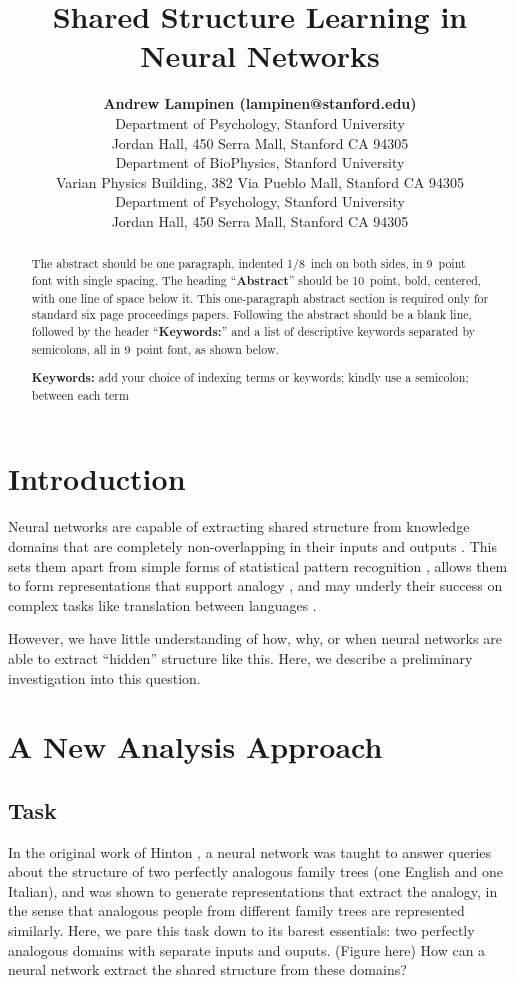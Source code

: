 \documentclass[10pt,letterpaper]{article}
\title{Shared Structure Learning in Neural Networks}
\author{{\large \bf Andrew Lampinen (lampinen@stanford.edu)} \\
  Department of Psychology, Stanford University \\
  Jordan Hall, 450 Serra Mall, Stanford CA 94305 
  \AND {\large \bf Shaw Hsu (cshawhsu@stanford.edu)} \\
  Department of BioPhysics, Stanford University \\
  Varian Physics Building, 382 Via Pueblo Mall, Stanford CA 94305
  \AND {\large \bf James L. McClelland (mcclelland@stanford.edu)} \\
  Department of Psychology, Stanford University \\
  Jordan Hall, 450 Serra Mall, Stanford CA 94305}
\begin{document}
\maketitle


\begin{abstract}
The abstract should be one paragraph, indented 1/8~inch on both sides,
in 9~point font with single spacing. The heading ``{\bf Abstract}''
should be 10~point, bold, centered, with one line of space below
it. This one-paragraph abstract section is required only for standard
six page proceedings papers. Following the abstract should be a blank
line, followed by the header ``{\bf Keywords:}'' and a list of
descriptive keywords separated by semicolons, all in 9~point font, as
shown below.

\textbf{Keywords:} 
add your choice of indexing terms or keywords; kindly use a
semicolon; between each term
\end{abstract}


\section{Introduction}
Neural networks are capable of extracting shared structure from knowledge domains that are completely non-overlapping in their inputs and outputs \cite{Hinton1986}. This sets them apart from simple forms of statistical pattern recognition \cite{Rogers2008}, allows them to form representations that support analogy \cite{Pennington2014,Kollias2013}, and may underly their success on complex tasks like translation between languages \cite[e.g.]{Wu2016}. \par
However, we have little understanding of how, why, or when neural networks are able to extract ``hidden'' structure like this. Here, we describe a preliminary investigation into this question. 
\section{A New Analysis Approach}
\subsection{Task}
In the original work of Hinton \cite{Hinton1986}, a neural network was taught to answer queries about the structure of two perfectly analogous family trees (one English and one Italian), and was shown to generate representations that extract the analogy, in the sense that analogous people from different family trees are represented similarly. Here, we pare this task down to its barest essentials: two perfectly analogous domains with separate inputs and ouputs. (Figure here) How can a neural network extract the shared structure from these domains? \par
\end{document}
